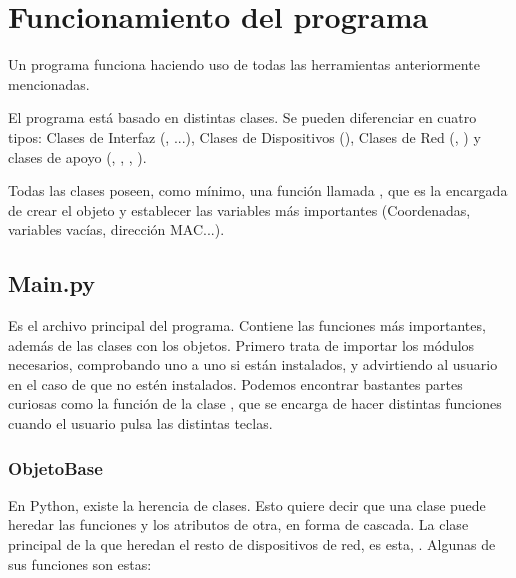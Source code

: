\documentclass[a4paper, 11pt]{report} %
\begin{document}
\section{Funcionamiento del programa}
Un programa funciona haciendo uso de todas las herramientas anteriormente mencionadas.

El programa está basado en distintas clases. Se pueden diferenciar en cuatro tipos: Clases de Interfaz (, ...), 
Clases de Dispositivos (), Clases de Red (, ) y clases de apoyo (, , , ).

Todas las clases poseen, como mínimo, una función llamada , que es la encargada de crear el objeto y establecer las variables más importantes (Coordenadas, variables vacías, dirección MAC...).

\subsection{Main.py}
Es el archivo principal del programa. Contiene las funciones más importantes, además de las clases con los objetos. Primero trata de importar los módulos necesarios, comprobando uno a uno si están instalados, y advirtiendo al usuario en el caso de que no estén instalados. Podemos encontrar bastantes partes curiosas como la función  de la clase , que se encarga de hacer distintas funciones cuando el usuario pulsa las distintas teclas.

\subsubsection{ObjetoBase}
En Python, existe la herencia de clases. Esto quiere decir que una clase puede heredar las funciones y los atributos de otra, en forma de cascada. La clase principal de la que heredan el resto de dispositivos de red, es esta, . Algunas de sus funciones son estas:

\newpage
\end{document}
